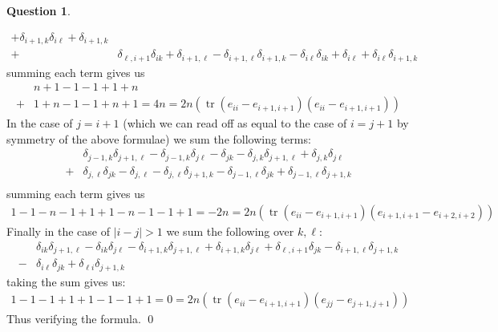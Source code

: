 \documentclass[10.5pt]{article}
\theoremstyle{definition}
\newtheorem{pb}{Question}
\numberwithin{example}{subsection}
\numberwithin{proposition}{subsection}
\newcommand{\abs}[1]{\left\vert#1\right\vert}
\begin{document}
\begin{pb}
\begin{enumerate}
\begin{align}
                + \delta_{i+1,k}\delta_{i\ell} + \delta_{i+1,k}\\
                + &\delta_{\ell,i+1}\delta_{ik} + \delta_{i+1,\ell} - \delta_{i+1,\ell}\delta_{i+1,k}
                - \delta_{i\ell}\delta_{ik} + \delta_{i\ell} + \delta_{i\ell}\delta_{i+1,k}
            \end{align}
            summing each term gives us
            \begin{align}
                &n + 1 - 1 - 1 + 1 + n \\
                + &1 + n - 1 - 1 + n + 1 = 4n = 2n(\operatorname{tr}(e_{ii} - e_{i+1,i+1})(e_{ii} - e_{i+1,i+1}))
            \end{align}
            In the case of \(j = i + 1\) (which we can read off as equal to the case of \(i = j+1\) by symmetry of the above formulae) we sum the following terms:
            \begin{align}
                &\delta_{j-1,k}\delta_{j+1,\ell} - \delta_{j-1,k}\delta_{j\ell} -  \delta_{jk} - \delta_{j,k}\delta_{j+1,\ell}
                + \delta_{j,k}\delta_{j\ell}\\
                + &\delta_{j,\ell}\delta_{jk} - \delta_{j,\ell} - \delta_{j,\ell}\delta_{j+1,k}
                - \delta_{j-1,\ell}\delta_{jk} + \delta_{j-1,\ell}\delta_{j+1,k} \\
            \end{align}
            summing each term gives us
            \begin{align}
                1 - 1 - n - 1 + 1 + 1 - n - 1 - 1 + 1 = -2n = 2n(\operatorname{tr}(e_{ii} - e_{i+1,i+1})(e_{i+1,i+1} - e_{i+2,i+2}))
            \end{align}
            Finally in the case of \(\abs{i-j} > 1\) we sum the following over \(k,\ell\):
            \begin{align}
                &\delta_{ik}\delta_{j+1,\ell} - \delta_{ik}\delta_{j\ell}
                - \delta_{i+1,k}\delta_{j+1,\ell} + \delta_{i+1,k}\delta_{j\ell} + \delta_{\ell,i+1}\delta_{jk} - \delta_{i+1,\ell}\delta_{j+1,k} \\
                - & \delta_{i\ell}\delta_{jk} + \delta_{\ell i}\delta_{j+1,k}
            \end{align}
            taking the sum gives us:
            \begin{align}
                1 - 1 - 1 + 1 + 1 - 1 -1 + 1 = 0 = 2n(\operatorname{tr}(e_{ii} - e_{i+1,i+1})(e_{jj} - e_{j+1,j+1}))
            \end{align}
            Thus verifying the formula. \qed
            

\end{enumerate}
\end{pb}
\end{document}
